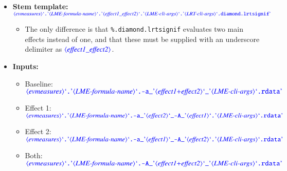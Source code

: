\documentclass[12pt]{report}
\def\blue{\color{blue}}
\begin{document}
\begin{itemize}
\item\textbf{Stem template:}\\
{\small $\dtype{evmeasures} \dcode{.} \dtype{LME-formula-name} \dcode{.} \dtype{effect1\_effect2} \dcode{.} \dtype{LME-cli-args} \dcode{.} \dtype{LRT-cli-args} \dcode{.diamond.lrtsignif}$}

\begin{itemize}
\item
The only difference is that {\tt\blue \%.diamond.lrtsignif} evaluates two main effects instead of one, and that these must be supplied with an underscore delimiter as $\dtype{effect1\_effect2}$.
\end{itemize}

\item\textbf{Inputs:}
\begin{itemize}
\item Baseline: $\dtype{evmeasures} \dcode{.} \dtype{LME-formula-name} \dcode{.-a\_} \dtype{effect1+effect2} \dcode{\_} \dtype{LME-cli-args} \dcode{.rdata}$
\item Effect 1: $\dtype{evmeasures} \dcode{.} \dtype{LME-formula-name} \dcode{.-a\_} \dtype{effect2} \dcode{\_-A\_} \dtype{effect1} \dcode{.} \dtype{LME-cli-args} \dcode{.rdata}$
\item Effect 2: $\dtype{evmeasures} \dcode{.} \dtype{LME-formula-name} \dcode{.-a\_} \dtype{effect1} \dcode{\_-A\_} \dtype{effect2} \dcode{.} \dtype{LME-cli-args} \dcode{.rdata}$
\item Both: $\dtype{evmeasures} \dcode{.} \dtype{LME-formula-name} \dcode{.-A\_} \dtype{effect1+effect2} \dcode{\_} \dtype{LME-cli-args} \dcode{.rdata}$
\end{itemize}
\end{itemize}



\end{document}
